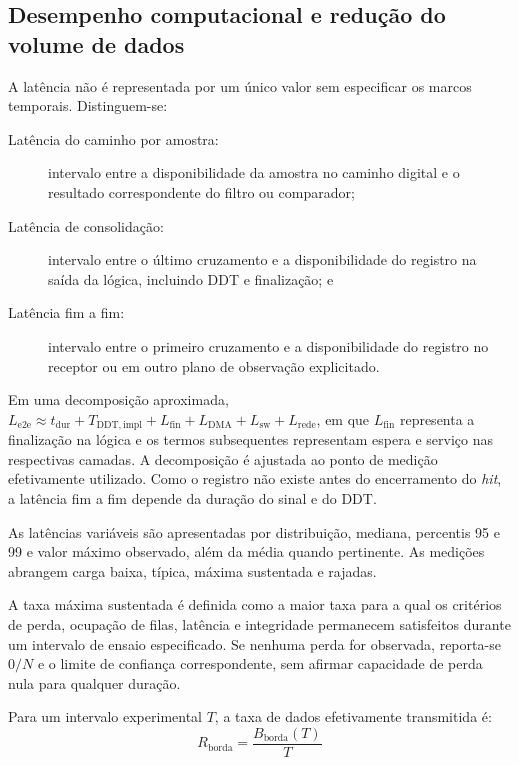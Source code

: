 \subsection{Desempenho computacional e redução do volume de dados}
\label{v2:subsec:desempenho_reducao_resultados}

A latência não é representada por um único valor sem especificar os marcos temporais. Distinguem-se:
\begin{description}
	\item[Latência do caminho por amostra:] intervalo entre a disponibilidade da amostra no caminho digital e o resultado correspondente do filtro ou comparador;
	
	\item[Latência de consolidação:] intervalo entre o último cruzamento e a disponibilidade do registro na saída da lógica, incluindo DDT e finalização; e
	
	\item[Latência fim a fim:] intervalo entre o primeiro cruzamento e a disponibilidade do registro no receptor ou em outro plano de observação explicitado.
\end{description}

Em uma decomposição aproximada, \(L_{\mathrm{e2e}} \approx t_{\mathrm{dur}} + T_{\mathrm{DDT,impl}} + L_{\mathrm{fin}} + L_{\mathrm{DMA}} + L_{\mathrm{sw}} + L_{\mathrm{rede}}\), em que \(L_{\mathrm{fin}}\) representa a finalização na lógica e os termos subsequentes representam espera e serviço nas respectivas camadas. A decomposição é ajustada ao ponto de medição efetivamente utilizado. Como o registro não existe antes do encerramento do \textit{hit}, a latência fim a fim depende da duração do sinal e do DDT.

As latências variáveis são apresentadas por distribuição, mediana, percentis 95 e 99 e valor máximo observado, além da média quando pertinente. As medições abrangem carga baixa, típica, máxima sustentada e rajadas.

A taxa máxima sustentada é definida como a maior taxa para a qual os critérios de perda, ocupação de filas, latência e integridade permanecem satisfeitos durante um intervalo de ensaio especificado. Se nenhuma perda for observada, reporta-se \(0/N\) e o limite de confiança correspondente, sem afirmar capacidade de perda nula para qualquer duração.

Para um intervalo experimental \(T\), a taxa de dados efetivamente transmitida é:
\begin{equation}
	R_{\mathrm{borda}} = \frac{B_{\mathrm{borda}}(T)}{T}
	\label{v2:eq:taxa_borda_resultados}
\end{equation}


